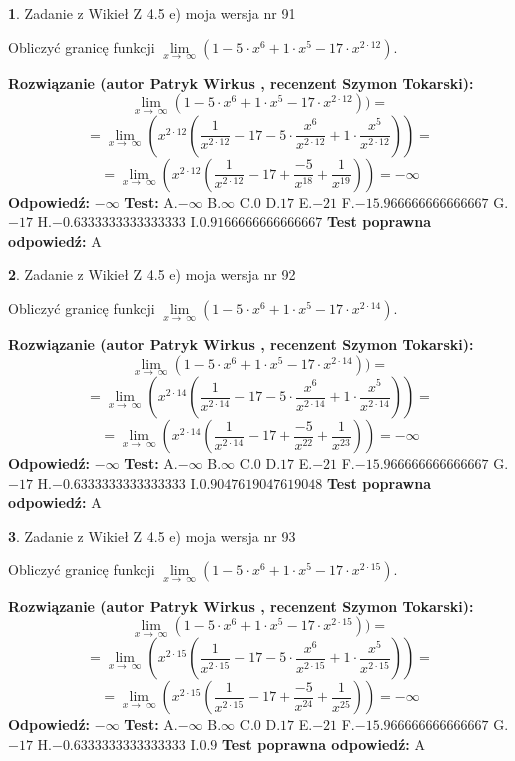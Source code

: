 \documentclass[12pt, a4paper]{article}
\theoremstyle{definition} %
\newtheorem{zad}{}
\newcommand{\zadStart}[1]{\begin{zad}#1\newline}
\newcommand{\zadStop}{\end{zad}}
\newcommand{\rozwStart}[2]{\noindent \textbf{Rozwiązanie (autor #1 , recenzent #2): }\newline}
\newcommand{\rozwStop}{\newline}
\newcommand{\odpStart}{\noindent \textbf{Odpowiedź:}\newline}
\newcommand{\odpStop}{\newline}
\newcommand{\testStart}{\noindent \textbf{Test:}\newline}
\newcommand{\testStop}{\newline}
\newcommand{\kluczStart}{\noindent \textbf{Test poprawna odpowiedź:}\newline}
\newcommand{\kluczStop}{\newline}
\begin{document}
\zadStart{Zadanie z Wikieł Z 4.5 e) moja wersja nr 91}


Obliczyć granicę funkcji  $\lim\limits_{x\to\ \infty}(1 - 5 \cdot x^{6}+1 \cdot x^{5}- 17 \cdot x^{2\cdot12})$.
\zadStop
\rozwStart{Patryk Wirkus}{Szymon Tokarski}
$$\lim\limits_{x\to\ \infty}(1 - 5 \cdot x^{6}+1 \cdot x^{5}- 17 \cdot x^{2\cdot12}))=$$
$$=\lim\limits_{x\to\ \infty}(x^{2\cdot12}(\frac{1}{x^{2\cdot12}}-17 -5 \cdot \frac{x^{6}}{x^{2\cdot12}}+1 \cdot \frac{x^{5}}{x^{2\cdot12}}))=$$
$$=\lim\limits_{x\to\ \infty}(x^{2\cdot12}(\frac{1}{x^{2\cdot12}}-17 + \frac{-5}{x^{18}}+ \frac{1}{x^{19}}))=-\infty$$
\rozwStop
\odpStart
$-\infty$
\odpStop
\testStart
A.$-\infty$ B.$\infty$ C.$0$ D.$17$ E.$-21$
F.$-15.966666666666667$ G.$-17$
H.$-0.6333333333333333$
I.$0.9166666666666667$
\testStop
\kluczStart
A
\kluczStop



\zadStart{Zadanie z Wikieł Z 4.5 e) moja wersja nr 92}


Obliczyć granicę funkcji  $\lim\limits_{x\to\ \infty}(1 - 5 \cdot x^{6}+1 \cdot x^{5}- 17 \cdot x^{2\cdot14})$.
\zadStop
\rozwStart{Patryk Wirkus}{Szymon Tokarski}
$$\lim\limits_{x\to\ \infty}(1 - 5 \cdot x^{6}+1 \cdot x^{5}- 17 \cdot x^{2\cdot14}))=$$
$$=\lim\limits_{x\to\ \infty}(x^{2\cdot14}(\frac{1}{x^{2\cdot14}}-17 -5 \cdot \frac{x^{6}}{x^{2\cdot14}}+1 \cdot \frac{x^{5}}{x^{2\cdot14}}))=$$
$$=\lim\limits_{x\to\ \infty}(x^{2\cdot14}(\frac{1}{x^{2\cdot14}}-17 + \frac{-5}{x^{22}}+ \frac{1}{x^{23}}))=-\infty$$
\rozwStop
\odpStart
$-\infty$
\odpStop
\testStart
A.$-\infty$ B.$\infty$ C.$0$ D.$17$ E.$-21$
F.$-15.966666666666667$ G.$-17$
H.$-0.6333333333333333$
I.$0.9047619047619048$
\testStop
\kluczStart
A
\kluczStop



\zadStart{Zadanie z Wikieł Z 4.5 e) moja wersja nr 93}


Obliczyć granicę funkcji  $\lim\limits_{x\to\ \infty}(1 - 5 \cdot x^{6}+1 \cdot x^{5}- 17 \cdot x^{2\cdot15})$.
\zadStop
\rozwStart{Patryk Wirkus}{Szymon Tokarski}
$$\lim\limits_{x\to\ \infty}(1 - 5 \cdot x^{6}+1 \cdot x^{5}- 17 \cdot x^{2\cdot15}))=$$
$$=\lim\limits_{x\to\ \infty}(x^{2\cdot15}(\frac{1}{x^{2\cdot15}}-17 -5 \cdot \frac{x^{6}}{x^{2\cdot15}}+1 \cdot \frac{x^{5}}{x^{2\cdot15}}))=$$
$$=\lim\limits_{x\to\ \infty}(x^{2\cdot15}(\frac{1}{x^{2\cdot15}}-17 + \frac{-5}{x^{24}}+ \frac{1}{x^{25}}))=-\infty$$
\rozwStop
\odpStart
$-\infty$
\odpStop
\testStart
A.$-\infty$ B.$\infty$ C.$0$ D.$17$ E.$-21$
F.$-15.966666666666667$ G.$-17$
H.$-0.6333333333333333$
I.$0.9$
\testStop
\kluczStart
A
\kluczStop
\end{document}
